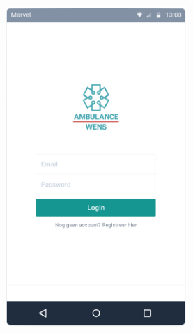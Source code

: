 \begin{figure}[!h]
  \centering
  \begin{subfigure}[h]{0.3\textwidth}
    \centering
    \includegraphics[width=0.76\textwidth]{images/care-athon/login.png}
  \end{subfigure}
  \begin{subfigure}[h]{0.3\textwidth}
    \centering

\end{subfigure}
\end{figure}
